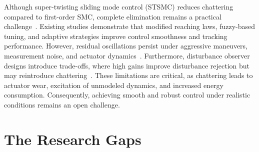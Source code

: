 \noindent Although super-twisting sliding mode control (STSMC) reduces chattering compared to first-order SMC, complete elimination remains a practical challenge~\cite{gedefaw2024improved,labbadi2020novel,sun2023attitude}. Existing studies demonstrate that modified reaching laws, fuzzy-based tuning, and adaptive strategies improve control smoothness and tracking performance. However, residual oscillations persist under aggressive maneuvers, measurement noise, and actuator dynamics~\cite{sun2023attitude}. Furthermore, disturbance observer designs introduce trade-offs, where high gains improve disturbance rejection but may reintroduce chattering~\cite{pan2021robust}. These limitations are critical, as chattering leads to actuator wear, excitation of unmodeled dynamics, and increased energy consumption. Consequently, achieving smooth and robust control under realistic conditions remains an open challenge.







\section{The Research Gaps}


